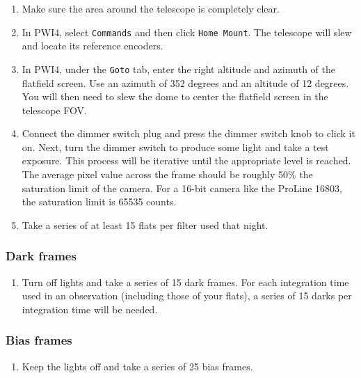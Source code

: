 \documentclass{article}
\begin{document}
	\begin{enumerate}
		
		\item Make sure the area around the telescope is completely clear.
		
		\item In PWI4, select \texttt{Commands} and then click \texttt{Home Mount}. The telescope will slew and locate its reference encoders.
		
		\item In PWI4, under the \texttt{Goto} tab, enter the right altitude and azimuth of the flatfield screen. Use an azimuth of 352 degrees and an altitude of 12 degrees. You will then need to slew the dome to center the flatfield screen in the telescope FOV.
		
		\item Connect the dimmer switch plug and press the dimmer switch knob to click it on. Next, turn the dimmer switch to produce some light and take a test exposure. This process will be iterative until the appropriate level is reached. The average pixel value across the frame should be roughly 50\% the saturation limit of the camera. For a 16-bit camera like the ProLine 16803, the saturation limit is 65535 counts.
		
		\item Take a series of at least 15 flats per filter used that night.
		
	\end{enumerate}

	\subsubsection{Dark frames}
	\label{sec:dark-frames}
	
	\begin{enumerate}
		
		\item Turn off lights and take a series of 15 dark frames. For each integration time used in an observation (including those of your flats), a series of 15 darks per integration time will be needed.
		
	\end{enumerate}

	\subsubsection{Bias frames}
	\label{sec:bias-frames}
	
	\begin{enumerate}
		
		\item Keep the lights off and take a series of 25 bias frames.
		
	\end{enumerate}
	
\end{document}
